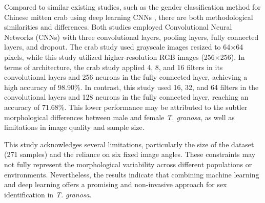 Compared to similar existing studies, such as the gender classification method for Chinese mitten crab using deep learning CNNs \cite{cui2020}, there are both methodological similarities and differences. Both studies employed Convolutional Neural Networks (CNNs) with three convolutional layers, pooling layers, fully connected layers, and dropout. The crab study used grayscale images resized to 64×64 pixels, while this study utilized higher-resolution RGB images (256×256). In terms of architecture, the crab study applied 4, 8, and 16 filters in its convolutional layers and 256 neurons in the fully connected layer, achieving a high accuracy of 98.90\%. In contrast, this study used 16, 32, and 64 filters in the convolutional layers and 128 neurons in the fully connected layer, reaching an accuracy of 71.68\%. This lower performance may be attributed to the subtler morphological differences between male and female \textit{T. granosa}, as well as limitations in image quality and sample size.
	
This study acknowledges several limitations, particularly the size of the dataset (271 samples) and the reliance on six fixed image angles. These constraints may not fully represent the morphological variability across different populations or environments. Nevertheless, the results indicate that combining machine learning and deep learning offers a promising and non-invasive approach for sex identification in \textit{T. granosa}.